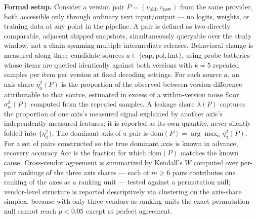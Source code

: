 \documentclass[11pt]{article}
\begin{document}
\noindent\textbf{Formal setup.} Consider a version pair $P = (v_{\mathrm{old}}, v_{\mathrm{new}})$ from the same provider, both accessible only through ordinary text input/output --- no logits, weights, or training data at any point in the pipeline. A pair is defined as two directly comparable, adjacent shipped snapshots, simultaneously queryable over the study window, not a chain spanning multiple intermediate releases. Behavioral change is measured along three candidate sources $a \in \{\text{cap}, \text{pol}, \text{fmt}\}$, using probe batteries whose items are queried identically against both versions with $k = 5$ repeated samples per item per version at fixed decoding settings. For each source $a$, an axis share $\eta^2_a(P)$ is the proportion of the observed between-version difference attributable to that source, estimated in excess of a within-version noise floor $\sigma^2_w(P)$ computed from the repeated samples. A leakage share $\lambda(P)$ captures the proportion of one axis's measured signal explained by another axis's independently measured features; it is reported as its own quantity, never silently folded into $\{\eta^2_a\}$. The dominant axis of a pair is $\mathrm{dom}(P) = \arg\max_a \eta^2_a(P)$. For a set of pairs constructed so the true dominant axis is known in advance, recovery accuracy $\mathrm{Acc}$ is the fraction for which $\mathrm{dom}(P)$ matches the known cause. Cross-vendor agreement is summarized by Kendall's $W$ computed over per-pair rankings of the three axis shares --- each of $m \geq 6$ pairs contributes one ranking of the axes as a ranking unit --- tested against a permutation null; vendor-level structure is reported descriptively via clustering on the axis-share simplex, because with only three vendors as ranking units the exact permutation null cannot reach $p < 0.05$ except at perfect agreement.
\end{document}
